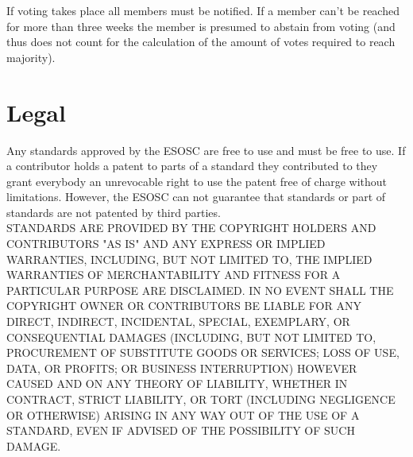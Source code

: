 \documentclass[paper=a4, fontsize=11pt]{scrartcl}
\numberwithin{equation}{section}
\numberwithin{figure}{section}
\numberwithin{table}{section}
\begin{document}
If voting takes place all members must be notified. If a member can't be reached for 
more than three weeks the member is presumed to abstain from voting (and thus does
not count for the calculation of the amount of votes required to reach majority). 


\section{Legal}

Any standards approved by the ESOSC are free to use and must be free to use. 
If a contributor holds a patent to parts of a standard they contributed to they
grant everybody an unrevocable right to use the patent free of charge without
limitations. However, the ESOSC can not guarantee that standards or part of 
standards are not patented by third parties. \\

STANDARDS ARE PROVIDED BY THE COPYRIGHT HOLDERS AND CONTRIBUTORS "AS IS" AND
ANY EXPRESS OR IMPLIED WARRANTIES, INCLUDING, BUT NOT LIMITED TO, THE IMPLIED
WARRANTIES OF MERCHANTABILITY AND FITNESS FOR A PARTICULAR PURPOSE ARE
DISCLAIMED. IN NO EVENT SHALL THE COPYRIGHT OWNER OR CONTRIBUTORS BE LIABLE FOR
ANY DIRECT, INDIRECT, INCIDENTAL, SPECIAL, EXEMPLARY, OR CONSEQUENTIAL DAMAGES
(INCLUDING, BUT NOT LIMITED TO, PROCUREMENT OF SUBSTITUTE GOODS OR SERVICES;
LOSS OF USE, DATA, OR PROFITS; OR BUSINESS INTERRUPTION) HOWEVER CAUSED AND
ON ANY THEORY OF LIABILITY, WHETHER IN CONTRACT, STRICT LIABILITY, OR TORT
(INCLUDING NEGLIGENCE OR OTHERWISE) ARISING IN ANY WAY OUT OF THE USE OF A
STANDARD, EVEN IF ADVISED OF THE POSSIBILITY OF SUCH DAMAGE.
\end{document}
